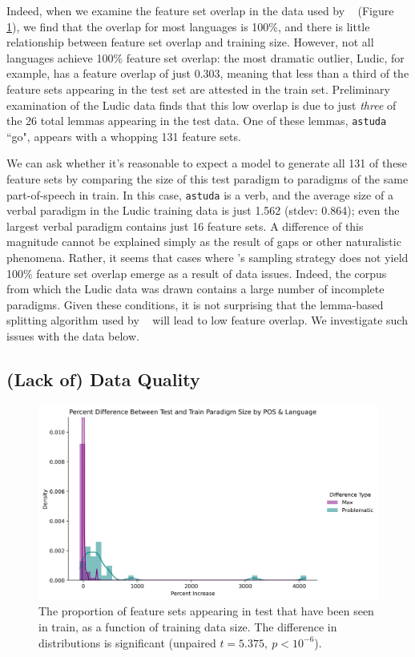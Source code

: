 \documentclass[11pt]{article}
\newcommand{\goldmana}{\citeauthor{goldman-etal-2022-un}}
\begin{document}
Indeed, when we examine the feature set overlap in the data used by \goldmana~ (Figure \ref{fig:feats_attested}), we find that the overlap for most languages is 100\%, and there is little relationship between feature set overlap and training size.
However, not all languages achieve 100\% feature set overlap:  the most dramatic outlier, Ludic, for example, has a feature overlap of just 0.303, meaning that less than a third of the feature sets appearing in the test set are attested in the train set.
Preliminary examination of the Ludic data finds that this low overlap is due to just \textit{three} of the 26 total lemmas appearing in the test data. 
One of these lemmas, \texttt{astuda} ``go", appears with a whopping 131 feature sets. 

We can ask whether it's reasonable to expect a model to generate all 131 of these feature sets by comparing the size of this test paradigm to paradigms of the same part-of-speech in train. 
In this case, \texttt{astuda}  is a verb, and the average size of a verbal paradigm in the Ludic training data is just 1.562 (stdev: 0.864); even the largest verbal paradigm contains just 16 feature sets. 
A difference of this magnitude cannot be explained simply as the result of gaps or other naturalistic phenomena. 
Rather, it seems that cases where \citeauthor{goldman-etal-2022-un}'s sampling strategy does not yield 100\% feature set overlap emerge as a result of data issues. 
Indeed, the corpus from which the Ludic data was drawn \citep{ludic} contains a large number of incomplete paradigms.
Given these conditions, it is not surprising  that the lemma-based splitting algorithm used by \goldmana~ will lead to low feature overlap. 
We investigate such issues with the data below.

\subsection{(Lack of) Data Quality}

\begin{figure}[h!]
\centering
\includegraphics[width=0.8\linewidth]{figs/percent_increase.png}
\caption{The proportion of feature sets appearing in test that have been seen in train, as a function of training data size. The difference in distributions is significant (unpaired $t = 5.375,~p < 10^{-6}$).}
\label{fig:feats_attested}
\end{figure}
\end{document}
